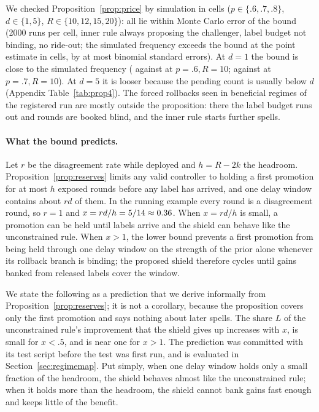 \documentclass[10pt]{article}
\theoremstyle{plain}
\theoremstyle{definition}
\begin{document}
We checked Proposition~\ref{prop:price} by simulation in \PFourCells{} cells ($p\in\{.6,.7,.8\}$, $d\in\{1,5\}$, $R\in\{10,12,15,20\}$): all lie within Monte Carlo error of the bound (2000 runs per cell, inner rule always proposing the challenger, label budget not binding, no ride-out; the simulated frequency exceeds the bound at the point estimate in \PFourAbove{} cells, by at most \PFourMaxZ{} binomial standard errors). At $d=1$ the bound is close to the simulated frequency (\PFourTightEmp{} against \PFourTightBound{} at $p=.6,R=10$; \PFourTightEmpB{} against \PFourTightBoundB{} at $p=.7,R=10$). At $d=5$ it is looser because the pending count is usually below $d$ (Appendix Table~\ref{tab:prop4}). The forced rollbacks seen in beneficial regimes of the registered run are mostly outside the proposition: there the label budget runs out and rounds are booked blind, and the inner rule starts further spells.

\paragraph{What the bound predicts.}
Let $r$ be the disagreement rate while deployed and $h=R-2k$ the headroom. Proposition~\ref{prop:reserves} limits any valid controller to holding a first promotion for at most $h$ exposed rounds before any label has arrived, and one delay window contains about $rd$ of them. In the running example every round is a disagreement round, so $r=1$ and $x=rd/h=5/14\approx0.36$.
When $x=rd/h$ is small, a promotion can be held until labels arrive and the shield can behave like the unconstrained rule.
When $x>1$, the lower bound prevents a first promotion from being held through one delay window on the strength of the prior alone whenever its rollback branch is binding; the proposed shield therefore cycles until gains banked from released labels cover the window.

We state the following as a prediction that we derive informally from Proposition~\ref{prop:reserves}; it is not a corollary, because the proposition covers only the first promotion and says nothing about later spells. The share $L$ of the unconstrained rule's improvement that the shield gives up increases with $x$, is small for $x<.5$, and is near one for $x>1$. The prediction was committed with its test script before the test was first run, and is evaluated in Section~\ref{sec:regimemap}. Put simply, when one delay window holds only a small fraction of the headroom, the shield behaves almost like the unconstrained rule; when it holds more than the headroom, the shield cannot bank gains fast enough and keeps little of the benefit.
\end{document}
